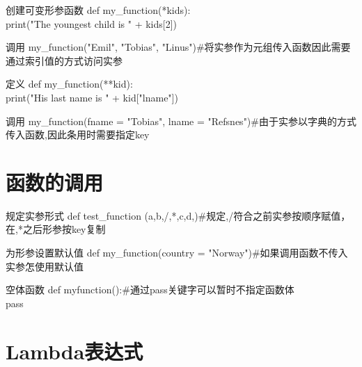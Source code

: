 \documentclass{beamer}
\begin{document}
\begin{frame}[t]
	\begin{block}{创建可变形参函数}
		def my\_function(*kids):\\
		print("The youngest child is " + kids[2])\\
	\end{block}
	\pause
	\begin{block}{调用}
		my\_function("Emil", "Tobias", "Linus")\#将实参作为元组传入函数因此需要通过索引值的方式访问实参
	\end{block}

\end{frame}
\begin{frame}[t]
	\begin{block}{定义}
		def my\_function(**kid):\\
		print("His last name is " + kid["lname"])\\
	\end{block}
	\pause
	\begin{block}{调用}
		my\_function(fname = "Tobias", lname = "Refsnes")\#由于实参以字典的方式传入函数,因此条用时需要指定key
	\end{block}
\end{frame}

\section{函数的调用}

\begin{frame}[t]
	\begin{block}{规定实参形式}
		def test\_function (a,b,/,*,c,d,)\#规定,/符合之前实参按顺序赋值，在,*之后形参按key复制
	\end{block}
	\pause
	\begin{block}{为形参设置默认值}
		def my\_function(country = "Norway")\#如果调用函数不传入实参怎使用默认值

	\end{block}
	\pause
	\begin{block}{空体函数}
		def myfunction():\#通过pass关键字可以暂时不指定函数体\\
		pass
	\end{block}

\end{frame}

\section{Lambda表达式}
\end{document}
